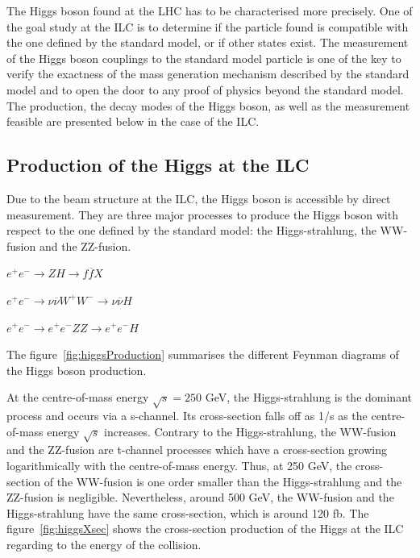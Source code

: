   The Higgs boson found at the \gls{LHC} has to be characterised more precisely.
  One of the goal study at the \gls{ILC} is to determine if the particle found is compatible with the one defined by the standard model, or if other states exist.
  The measurement of the Higgs boson couplings to the standard model particle is one of the key to verify the exactness of the mass generation mechanism described by the standard model and to open the door to any proof of physics beyond the standard model.
  The production, the decay modes of the Higgs boson, as well as the measurement feasible are presented below in the case of the \gls{ILC}.


    \subsection{Production of the Higgs at the ILC}

    Due to the beam structure at the \gls{ILC}, the Higgs boson is accessible by direct measurement.
    They are three major processes to produce the Higgs boson with respect to the one defined by the standard model: the Higgs-strahlung, the WW-fusion and the ZZ-fusion.

    \begin{description}
      \centering
      \item[Higgs-strahlung:] $e^+e^- \rightarrow ZH \rightarrow f\overline{f}X$
      \item[WW-fusion:] $e^+e^- \rightarrow \nu \overline{\nu} W^+W^- \rightarrow \nu \overline{\nu} H$
      \item[ZZ-fusion:] $e^+e^- \rightarrow e^+e^- ZZ \rightarrow e^+e^- H$
    \end{description}

    The figure~\ref{fig:higgsProduction} summarises the different Feynman diagrams of the Higgs boson production.


    At the centre-of-mass energy $\sqrt{s} = 250$ GeV, the Higgs-strahlung is the dominant process and occurs via a s-channel. 
    Its cross-section falls off as 1/s as the centre-of-mass energy $\sqrt{s}$ increases.
    Contrary to the Higgs-strahlung, the WW-fusion and the ZZ-fusion are t-channel processes which have a cross-section growing logarithmically with the centre-of-mass energy.
    Thus, at 250 GeV, the cross-section of the WW-fusion is one order smaller than the Higgs-strahlung and the ZZ-fusion is negligible.
    Nevertheless, around 500 GeV, the WW-fusion and the Higgs-strahlung have the same cross-section, which is around 120 fb.
    The figure~\ref{fig:higgsXsec} shows the cross-section production of the Higgs at the ILC regarding to the energy of the collision.
    

